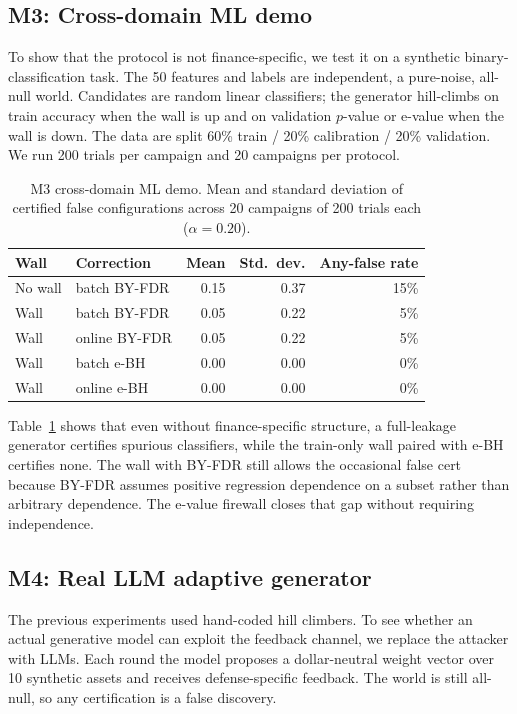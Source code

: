 \documentclass[sigconf]{acmart}
\theoremstyle{plain}
\begin{document}
\subsection{M3: Cross-domain ML demo}\label{sec:m3}

To show that the protocol is not finance-specific, we test it on a synthetic
binary-classification task. The 50 features and labels are independent, a
pure-noise, all-null world. Candidates are random linear classifiers; the
generator hill-climbs on train accuracy when the wall is up and on validation
$p$-value or e-value when the wall is down. The data are split 60\% train /
20\% calibration / 20\% validation. We run 200 trials per campaign and 20
campaigns per protocol.

\begin{table}[t]
\caption{M3 cross-domain ML demo. Mean and standard deviation of certified
  false configurations across 20 campaigns of 200 trials each
  ($\alpha=0.20$).}
\label{tab:m3}
\footnotesize
\begin{tabular}{@{}llrrr@{}}
\toprule
Wall & Correction & Mean & Std.~dev. & Any-false rate \\
\midrule
No wall & batch BY-FDR & 0.15 & 0.37 & 15\% \\
Wall & batch BY-FDR & 0.05 & 0.22 & 5\% \\
Wall & online BY-FDR & 0.05 & 0.22 & 5\% \\
Wall & batch e-BH & 0.00 & 0.00 & 0\% \\
Wall & online e-BH & 0.00 & 0.00 & 0\% \\
\bottomrule
\end{tabular}
\end{table}

Table~\ref{tab:m3} shows that even without finance-specific structure, a
full-leakage generator certifies spurious classifiers, while the train-only wall
paired with e-BH certifies none. The wall with BY-FDR still allows the occasional
false cert because BY-FDR assumes positive regression dependence on a subset
rather than arbitrary dependence. The e-value firewall closes that gap without
requiring independence.

\subsection{M4: Real LLM adaptive generator}\label{sec:m4}

The previous experiments used hand-coded hill climbers. To see whether an actual
generative model can exploit the feedback channel, we replace the attacker with
LLMs. Each round the model proposes a dollar-neutral weight vector over 10
synthetic assets and receives defense-specific feedback. The world is still
all-null, so any certification is a false discovery.
\end{document}
